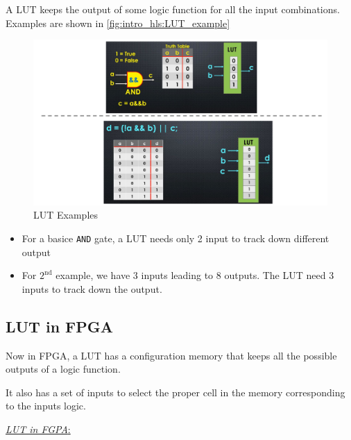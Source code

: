 A LUT keeps the output of some logic function for all the input combinations. Examples are shown in \autoref{fig:intro_hls:LUT_example}

\begin{figure}[h]
\centering
\includegraphics[scale=0.7,frame]{Figures/intro_hls/LUT_example}
\caption{LUT Examples}
\label{fig:intro_hls:LUT_example}
\end{figure}

\begin{itemize}

\item For a basice \verb|AND| gate, a LUT needs only 2 input to track down different output

\item For $\mathrm{2}^\mathrm{nd}$ example, we have 3 inputs leading to 8 outputs. The LUT need 3 inputs to track down the output.


\end{itemize}

\subsection{LUT in FPGA}

Now in FPGA, a LUT has a configuration memory that keeps all the possible outputs of a logic function.

It also has a set of inputs to select the proper cell in the memory corresponding to the inputs logic.

 \underline{\textit{LUT in FGPA}:}

